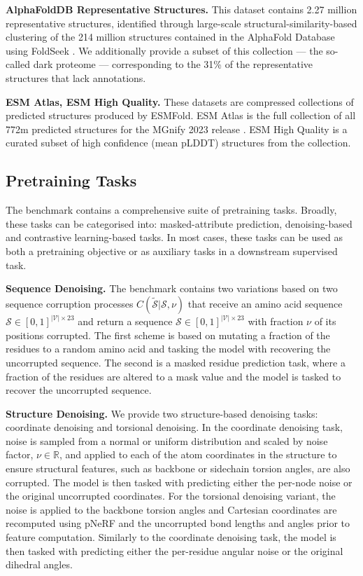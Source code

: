 \textbf{AlphaFoldDB Representative Structures.} This dataset contains 2.27 million representative structures, identified through large-scale structural-similarity-based clustering of the 214 million structures contained in the AlphaFold Database \citep{Varadi2021} using FoldSeek \citep{vanKempen2023}. We additionally provide a subset of this collection --- the so-called dark proteome --- corresponding to the 31\% of the representative structures that lack annotations.


\textbf{ESM Atlas, ESM High Quality.} These datasets are compressed collections of predicted structures produced by ESMFold. ESM Atlas is the full collection of all 772m predicted structures for the MGnify 2023 release \citep{Richardson2022}. ESM High Quality is a curated subset of high confidence (mean pLDDT) structures from the collection.



\subsection{Pretraining Tasks}
\label{app:pretraining-tasks}

The benchmark contains a comprehensive suite of pretraining tasks. Broadly, these tasks can be categorised into: masked-attribute prediction, denoising-based and contrastive learning-based tasks. In most cases, these tasks can be used as both a pretraining objective or as auxiliary tasks in a downstream supervised task.

\textbf{Sequence Denoising. } The benchmark contains two variations based on two sequence corruption processes $C(\tilde{\mathcal{S}} | \mathcal{S}, \nu)$ that receive an amino acid sequence $\mathcal{S} \in [0, 1]^{|\mathcal{V}| \times 23 }$ and return a sequence $\mathcal{S} \in [0, 1]^{|\mathcal{V}| \times 23 }$ with fraction $\nu$ of its positions corrupted. The first scheme is based on mutating a fraction of the residues to a random amino acid and tasking the model with recovering the uncorrupted sequence. The second is a masked residue prediction task, where a fraction of the residues are altered to a mask value and the model is tasked to recover the uncorrupted sequence.

\textbf{Structure Denoising. } We provide two structure-based denoising tasks: coordinate denoising and torsional denoising. In the coordinate denoising task, noise is sampled from a normal or uniform distribution and scaled by noise factor, $\nu \in \mathbb{R}$, and applied to each of the atom coordinates in the structure to ensure structural features, such as backbone or sidechain torsion angles, are also corrupted. The model is then tasked with predicting either the per-node noise or the original uncorrupted coordinates. For the torsional denoising variant, the noise is applied to the backbone torsion angles and Cartesian coordinates are recomputed using pNeRF \citep{AlQuraishi2019} and the uncorrupted bond lengths and angles prior to feature computation. Similarly to the coordinate denoising task, the model is then tasked with predicting either the per-residue angular noise or the original dihedral angles.

